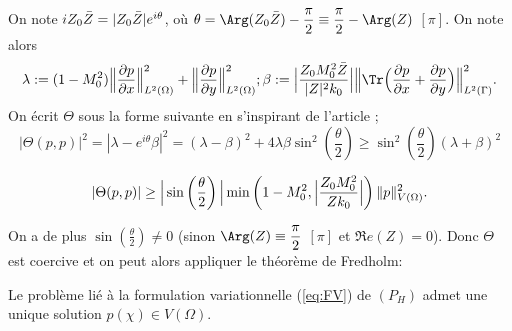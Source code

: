 On note \(iZ_0\Bar{Z} =  |Z_0\Bar{Z}| e^{i\theta}\), où \(\displaystyle\theta = \Arg(Z_0\Bar{Z}) - \frac{\pi}{2} \equiv \frac{\pi}{2} - \Arg(Z)\) \( [\pi]\). On note alors
\[\lambda := (1-M_0^2)\Big\|\frac{\partial p}{\partial x}\Big\|^2_{L^2(\Omega)} + \Big\|\frac{\partial p}{\partial y}\Big\|^2_{L^2(\Omega)}; \beta := \Big|\frac{Z_0M_0^2\Bar{Z}}{|Z|^2k_0}\Big|\Big\| \Tr \Bigl( \frac{\partial p}{\partial x}+\frac{\partial p}{\partial y}\Bigr)\Big\|^2_{L^2(\Gamma)}.\]
On écrit $\Theta$ sous la forme suivante en s'inspirant de l'article \cite{2} ;\\
\[
|\Theta(p, p)|^2 = | \lambda - e^{i\theta}\beta|^2 = (\lambda - \beta)^2 + 4\lambda\beta \sin^2\left(\frac{\theta}{2}\right) \geq \sin^2\left(\frac{\theta}{2}\right) (\lambda + \beta)^2 \]

\[ |\Theta(p, p)| \geq \Big|\sin\left(\frac{\theta}{2}\right)\Big| \min \left( 1 - M_0^2, \Bigl|\frac{Z_0M_0^2}{Zk_0}\Bigl| \right) \lVert p \rVert_{V(\Omega)}^2. \]


On a de plus $\displaystyle\sin\left(\frac{\theta}{2}\right)\neq 0$ (sinon $\displaystyle \Arg(Z) \equiv \frac{\pi}{2}$ $[\pi]$ et $\Re e(Z) = 0$). Donc $\Theta$ est coercive et on peut alors appliquer le théorème de Fredholm:

\begin{tcolorbox}[colback=green!5!white,colframe=green!75!black,title=Théorème 4.4.1: Caractère bien posé du problème]
Le problème lié à la formulation variationnelle (\ref{eq:FV}) de $(P_H)$ admet une unique solution $p(\chi)\in V(\Omega)$.
\end{tcolorbox}